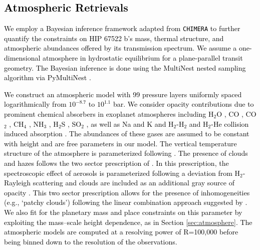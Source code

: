 \documentclass[twocolumn]{aastex63} %
\newcommand{\plname}{HIP 67522 b}
\newcommand{\newedit}[1]{\textcolor{black}{#1}}
\begin{document}
\newedit{\section{Atmospheric Retrievals} \label{sec:retreivals}}

\newedit{We employ a Bayesian inference framework adapted from \texttt{CHIMERA} \citep[e.g.,][]{line_systematic_2013} to further quantify the constraints on \plname's mass, thermal structure, and atmospheric abundances offered by its transmission spectrum. We assume a one-dimensional atmosphere in hydrostatic equilibrium for a plane-parallel transit geometry. The Bayesian inference is done using the MultiNest nested sampling algorithm \citep{feroz2009multinest} via PyMultiNest  \citep{buchner_x-ray_2014}.}

\newedit{We construct an atmospheric model with 99 pressure layers uniformly spaced logarithmically from $10^{-8.7}$ to $10^{1.1}$ bar. We consider opacity contributions due to prominent chemical absorbers in  exoplanet atmospheres \citep[e.g.,][]{madhusudhan_exoplanetary_2019} including H$_2$O \citep{polyansky_exomol_2018}, CO \citep{li_rovibrational_2015}, CO$_2$ \citep{huang_isotopic-independent_2012}, CH$_4$ \citep{hargreaves_accurate_2020}, NH$_3$ \citep{coles_exomol_2019}, H$_2$S \citep{azzam_exomol_2016}, SO$_2$ \citep{underwood_exomol_2016}, as well as Na and K \citep{allard_k-h2_2016,allard_temperature_2023} and H$_2$-H$_2$ and H$_2$-He collision induced absorption \citep{karman_update_2019}. The abundances of these gases are assumed to be constant with height and are free parameters in our model. The vertical temperature structure of the atmosphere is parameterized following \citet{madhusudhan_temperature_2009}. The presence of clouds and hazes follows the two sector prescription of \citet{welbanks_aurora_2021}. In this prescription, the spectroscopic effect of aerosols is parameterized following a deviation from H$_2$-Rayleigh scattering \citep[e.g.,][]{lecavelier_des_etangs_rayleigh_2008} and clouds are included as an additional gray source of opacity \citep[e.g.,][]{mai_exploring_2019, Welbanks2024}. This two sector prescription allows for the presence of inhomogeneities (e.g., `patchy clouds') following the linear combination approach suggested by \citet{line_influence_2016}. We also fit for the planetary mass and place constraints on this parameter by exploiting the mass--scale height dependence, as in Section \ref{sec:atmosphere}. 
The atmospheric models are computed at a resolving power of R=100,000 before being binned down to the resolution of the observations.}
\end{document}
